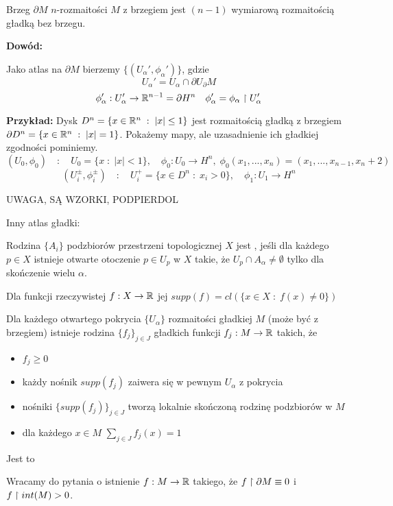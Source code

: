\begin{fakt}
    Brzeg $\partial M$ $n$-rozmaitości $M$ z brzegiem jest $(n-1)$ wymiarową rozmaitością gładką bez brzegu.
\end{fakt}

\textbf{Dowód:}

Jako atlas na $\partial M$ bierzemy $\{(U_\alpha',\phi_\alpha')\}$, gdzie 
$$U_\alpha'=U_\alpha\cap\partial U_\partial M$$
$$\phi_\alpha':U_\alpha'\to\mathbb{R}^{n-1}=\partial H^n\quad \phi_\alpha'=\phi_\alpha\upharpoonright U_\alpha'$$
\proofend

\textbf{Przykład:} Dysk $D^n=\{x\in\mathbb{R}^n\;:\;|x|\leq 1\}$ jest rozmaitością gładką z brzegiem $\partial D^n=\{x\in\mathbb{R}^n\;:\;|x|=1\}$. Pokażemy mapy, ale uzasadnienie ich gładkiej zgodności pominiemy.
$$(U_0,\phi_0)\quad:\quad U_0=\{x\;:\;|x|<1\},\quad\phi_0:U_0\to H^n,\;\phi_0(x_1,...,x_n)=(x_1,...,x_{n-1},x_n+2)$$
$$(U_i^\pm,\phi_i^\pm)\quad:\quad U_i^+=\{x\in D^n\;:\;x_i>0\},\quad\phi_1:U_1\to H^n$$

{\large\color{orange}UWAGA, SĄ WZORKI, PODPIERDOL}

Inny atlas gładki:

\begin{definicja}
Rodzina $\{A_i\}$ podzbiorów przestrzeni topologicznej $X$ jest , jeśli dla każdego $p\in X$ istnieje otwarte otoczenie $p\in U_p$ w $X$ takie, że $U_p\cap A_\alpha\neq\emptyset$ tylko dla skończenie wielu $\alpha$.
\end{definicja}

\begin{definicja}
Dla funkcji rzeczywistej $f:X\to\mathbb{R}$ jej  $supp(f)=cl(\{x\in X\;:\;f(x)\neq0\})$
\end{definicja}

\begin{tw} Dla każdego otwartego pokrycia $\{U_\alpha\}$ rozmaitości gładkiej $M$ (może być z brzegiem) istnieje rodzina $\{f_j\}_{j\in J}$ gładkich funkcji $f_j:M\to\mathbb{R}$ takich, że
\begin{itemize}
    \item $f_j\geq0$
    \item każdy nośnik $supp(f_j)$ zaiwera się w pewnym $U_\alpha$ z pokrycia
    \item nośniki $\{supp(f_j)\}_{j\in J}$ tworzą lokalnie skończoną rodzinę podzbiorów w $M$
    \item dla każdego $x\in M$ $\sum\limits_{j\in J}f_j(x)=1$
\end{itemize}
Jest to 
\end{tw}

Wracamy do pytania o istnienie $f:M\to\mathbb{R}$ takiego, że $f\upharpoonright\partial M\equiv 0$ i $f\upharpoonright int(M)>0$. 